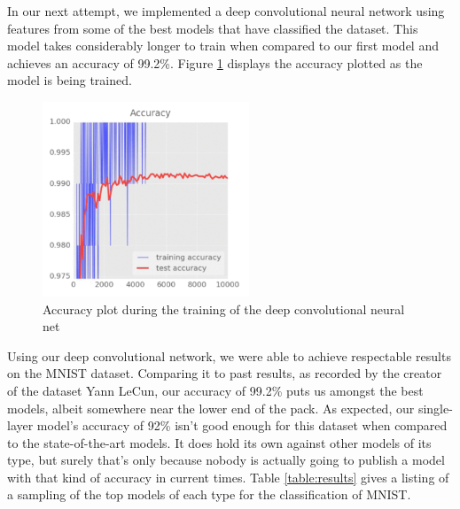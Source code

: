 \documentclass{article}
\begin{document}
In our next attempt, we implemented a deep convolutional neural network using features from some of the best models that have classified the dataset. This model takes considerably longer to train when compared to our first model and achieves an accuracy of 99.2\%. Figure \ref{fig:mnist-deepcnn} displays the accuracy plotted as the model is being trained.

\begin{figure}[h]
	\centering
	\includegraphics[width=0.55\textwidth]{mnist-deepcnn.png}
    \caption{Accuracy plot during the training of the deep convolutional neural net}
    \label{fig:mnist-deepcnn}
\end{figure}

Using our deep convolutional network, we were able to achieve respectable results on the MNIST dataset. Comparing it to past results, as recorded by the creator of the dataset Yann LeCun, our accuracy of 99.2\% puts us amongst the best models, albeit somewhere near the lower end of the pack. As expected, our single-layer model's accuracy of 92\% isn't good enough for this dataset when compared to the state-of-the-art models. It does hold its own against other models of its type, but surely that's only because nobody is actually going to publish a model with that kind of accuracy in current times. Table \ref{table:results} gives a listing of a sampling of the top models of each type for the classification of MNIST.
\end{document}
